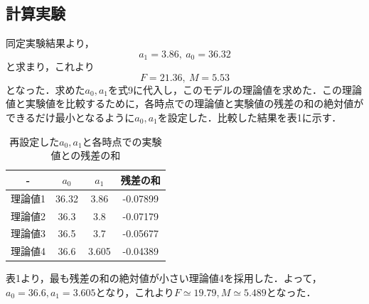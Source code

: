 \documentclass[11pt,a4paper]{jsarticle}
\begin{document}
  \subsection{計算実験}
  同定実験結果より，
  \begin{equation}
   a_1 = 3.86, \ a_0 = 36.32
  \end{equation}
  と求まり，これより
  \begin{equation}
   F = 21.36, \ M = 5.53
  \end{equation}
  となった．求めた$a_0,a_1$を式9に代入し，このモデルの理論値を求めた．この理論値と実験値を比較するために，各時点での理論値と実験値の残差の和の絶対値ができるだけ最小となるように$a_0,a_1$を設定した．比較した結果を表1に示す．
  \begin{table}[b]
   \centering
   \caption{再設定した$a_0,a_1$と各時点での実験値との残差の和}
   \begin{tabular}{|c||c|c|c|} \hline 
    - & $a_0$ & $a_1$ & 残差の和 \\ \hline \hline
    理論値1 & 36.32 & 3.86 &  -0.07899 \\ \hline
    理論値2 & 36.3 & 3.8 & -0.07179 \\ \hline
    理論値3 & 36.5 & 3.7 & -0.05677 \\ \hline
    理論値4 & 36.6 & 3.605 & -0.04389 \\ \hline
   \end{tabular}
  \end{table}
  表1より，最も残差の和の絶対値が小さい理論値4を採用した．よって，$a_0 = 36.6,a_1 = 3.605$となり，これより$F \simeq 19.79,M \simeq 5.489$となった．
  
\end{document}
